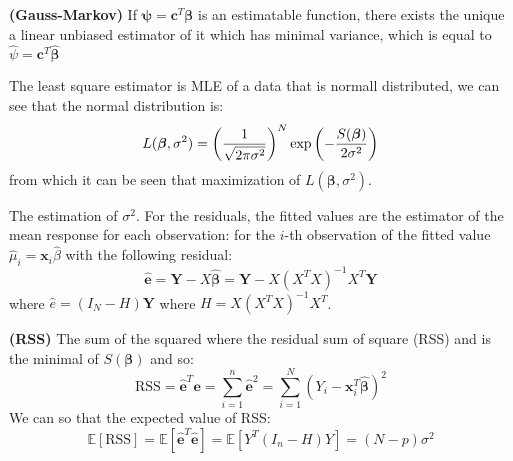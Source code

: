 \begin{theorem}{\textbf{(Gauss-Markov)}}
    If $\boldsymbol \psi = \boldsymbol c^T\boldsymbol \beta$ is an estimatable function, there exists the unique a linear unbiased estimator of it which has minimal variance, which is equal to $\hat{\psi} = \boldsymbol c^T\hat{\boldsymbol \beta}$ 
\end{theorem}

\begin{remark}
    The least square estimator is MLE of a data that is normall distributed, we can see that the normal distribution is:
    \begin{equation*}
        L(\boldsymbol \beta, \sigma^2) = \left( \frac{1}{\sqrt{2\pi\sigma^2}} \right)^N\exp\left( -\frac{S(\boldsymbol \beta)}{2\sigma^2} \right)
    \end{equation*}
    from which it can be seen that maximization of $L(\boldsymbol \beta, \sigma^2)$.
\end{remark}

\begin{remark}
    The estimation of $\sigma^2$. For the residuals, the fitted values are the estimator of the mean response for each observation: for the $i$-th observation of the fitted value $\hat{\mu}_i = \boldsymbol x_i\hat{\beta}$ with the following residual:
    \begin{equation*}
        \hat{\boldsymbol e} = \boldsymbol Y - X\hat{\boldsymbol \beta} = \boldsymbol Y - X(X^TX)^{-1}X^T\boldsymbol Y
    \end{equation*}
    where $\hat{e} = (I_N - H)\boldsymbol Y$ where $H = X(X^TX)^{-1}X^T$.
\end{remark}

\begin{definition}{\textbf{(RSS)}}
    The sum of the squared where the residual sum of square (RSS) and is the minimal of $S(\boldsymbol \beta)$ and so:
    \begin{equation*}
        \text{RSS} = \hat{\boldsymbol e}^T\boldsymbol e = \sum^n_{i=1}\hat{\boldsymbol e}^2 = \sum^N_{i=1} (Y_i - \boldsymbol x_i^T\hat{\boldsymbol \beta})^2
    \end{equation*}
    We can so that the expected value of RSS:
    \begin{equation*}
        \mathbb{E}[\text{RSS}] = \mathbb{E}[\hat{\boldsymbol e}^T\hat{\boldsymbol e}] = \mathbb{E}[Y^T(I_n-H)Y] = (N-p)\sigma^2
    \end{equation*}
\end{definition}

